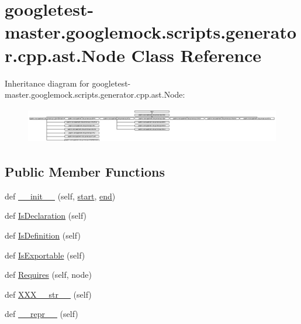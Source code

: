 \hypertarget{classgoogletest-master_1_1googlemock_1_1scripts_1_1generator_1_1cpp_1_1ast_1_1_node}{}\section{googletest-\/master.googlemock.\+scripts.\+generator.\+cpp.\+ast.\+Node Class Reference}
\label{classgoogletest-master_1_1googlemock_1_1scripts_1_1generator_1_1cpp_1_1ast_1_1_node}
Inheritance diagram for googletest-\/master.googlemock.\+scripts.\+generator.\+cpp.\+ast.\+Node\+:\begin{figure}[H]
\begin{center}
\leavevmode
\includegraphics[height=1.572052cm]{d9/df9/classgoogletest-master_1_1googlemock_1_1scripts_1_1generator_1_1cpp_1_1ast_1_1_node}
\end{center}
\end{figure}
\subsection*{Public Member Functions}
\begin{DoxyCompactItemize}
\item 
def \mbox{\hyperlink{classgoogletest-master_1_1googlemock_1_1scripts_1_1generator_1_1cpp_1_1ast_1_1_node_a2d5197ecd5b39f31c38b61a54b481eb8}{\+\_\+\+\_\+init\+\_\+\+\_\+}} (self, \mbox{\hyperlink{classgoogletest-master_1_1googlemock_1_1scripts_1_1generator_1_1cpp_1_1ast_1_1_node_a6f9eb279a989f9ca27e7d0f1975336d1}{start}}, \mbox{\hyperlink{classgoogletest-master_1_1googlemock_1_1scripts_1_1generator_1_1cpp_1_1ast_1_1_node_a747e90ade89c1764e83b5b649bde18cc}{end}})
\item 
def \mbox{\hyperlink{classgoogletest-master_1_1googlemock_1_1scripts_1_1generator_1_1cpp_1_1ast_1_1_node_ac675d48443725155c9e5a16a4079a163}{Is\+Declaration}} (self)
\item 
def \mbox{\hyperlink{classgoogletest-master_1_1googlemock_1_1scripts_1_1generator_1_1cpp_1_1ast_1_1_node_a3a3edec9cd30222cfea1295005abadd3}{Is\+Definition}} (self)
\item 
def \mbox{\hyperlink{classgoogletest-master_1_1googlemock_1_1scripts_1_1generator_1_1cpp_1_1ast_1_1_node_a84e05fc36f3b1f650b0aad690ef91c3a}{Is\+Exportable}} (self)
\item 
def \mbox{\hyperlink{classgoogletest-master_1_1googlemock_1_1scripts_1_1generator_1_1cpp_1_1ast_1_1_node_a2e88d3bf96b19fe72c26eec93e104381}{Requires}} (self, node)
\item 
def \mbox{\hyperlink{classgoogletest-master_1_1googlemock_1_1scripts_1_1generator_1_1cpp_1_1ast_1_1_node_a496b2c76aad75a37d4b1a5a78e4ca8d8}{X\+X\+X\+\_\+\+\_\+str\+\_\+\+\_\+}} (self)
\item 
def \mbox{\hyperlink{classgoogletest-master_1_1googlemock_1_1scripts_1_1generator_1_1cpp_1_1ast_1_1_node_ae94af5dcad8d7711ec28a29afdfa695c}{\+\_\+\+\_\+repr\+\_\+\+\_\+}} (self)
\end{DoxyCompactItemize}
